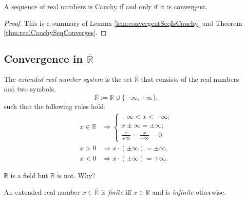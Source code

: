 \begin{thm}
  \label{thm:completenessOfRealNumbers}
  A sequence of real numbers is Cauchy
  if and only if it is convergent.
\end{thm}
\begin{proof}
  This is a summary of
  Lemma \ref{lem:convergentSeqIsCauchy}
  and Theorem \ref{thm:realCauchySeqConverges}.
\end{proof}


\subsection{Convergence in $\overline{\mathbb{R}}$}
\label{sec:convergenceOfSequenceInRStar}

\begin{defn}
  \label{def:extendedReals}
  The \emph{extended real number system} is 
  the set $\overline{\mathbb{R}}$ that consists of the real numbers %
   and two symbols, %
  \begin{equation}
    \label{eq:extendedReals}
    \overline{\mathbb{R}} := \mathbb{R} \cup \{-\infty, + \infty\}, 
  \end{equation}
  such that the following rules hold:
  \begin{subequations}
    \label{eq:extendedRealsConditions}
    \begin{align}
      x\in \mathbb{R}
      &\Rightarrow \left\{
        \begin{array}{l}
          -\infty < x < +\infty; 
          \\
          x\pm\infty = \pm\infty; %
          \\
          \frac{x}{+\infty} = \frac{x}{-\infty} = 0,
        \end{array}\right.
      \\
      x>0 &\Rightarrow x\cdot(\pm\infty) = \pm \infty,
      \\
      x<0 &\Rightarrow x\cdot(\pm\infty) = \mp \infty.
    \end{align}
  \end{subequations}
\end{defn}

\begin{rem}
  $\mathbb{R}$ is a field but $\overline{\mathbb{R}}$ is not.
  Why?
\end{rem}

\begin{defn}
  An extended real number $x\in \overline{\mathbb{R}}$
  is \emph{finite} iff $x\in \mathbb{R}$
  and is \emph{infinite} otherwise.
\end{defn}

